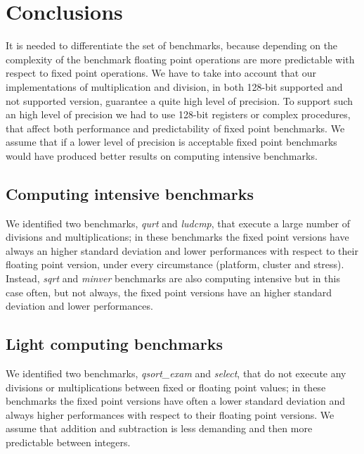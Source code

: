 \section{Conclusions}
It is needed to differentiate the set of benchmarks, because depending on the complexity of the benchmark floating point operations are more predictable with respect to fixed point operations.\newline
We have to take into account that our implementations of multiplication and division, in both 128-bit supported and not supported version, guarantee a quite high level of precision.
To support such an high level of precision we had to use 128-bit registers or complex procedures, that affect both performance and predictability of fixed point benchmarks. We assume that if a lower level of precision is acceptable fixed point benchmarks would have produced better results on computing intensive benchmarks.
 
\subsection{Computing intensive benchmarks}
We identified two benchmarks, \textit{qurt} and \textit{ludcmp}, that execute a large number of divisions and multiplications; in these benchmarks the fixed point versions have always an higher standard deviation and lower performances with respect to their floating point version, under every circumstance (platform, cluster and stress).
Instead, \textit{sqrt} and \textit{minver} benchmarks are also computing intensive but in this case often, but not always, the fixed point versions have an higher standard deviation and lower performances.

\subsection{Light computing benchmarks}
We identified two benchmarks, \textit{qsort\_exam} and \textit{select}, that do not execute any divisions or multiplications between fixed or floating point values; in these benchmarks the fixed point versions have often a lower standard deviation and always higher performances with respect to their floating point versions.\newline
We assume that addition and subtraction is less demanding and then more predictable between integers.

